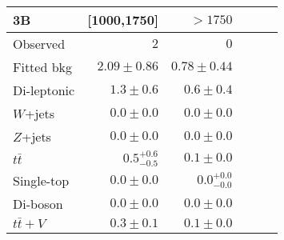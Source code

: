 \begin{tabular*}{\textwidth}{@{\extracolsep{\fill}}lrrrrr}
\toprule
\textbf{3B} & [1000,1750] & $>1750$ \\
\midrule
Observed          & $2$              & $0$                    \\
\midrule
Fitted bkg         & $2.09 \pm 0.86$          & $0.78 \pm 0.44$              \\
\midrule
        Di-leptonic         & $1.3 \pm 0.6$          & $0.6 \pm 0.4$              \\
        $W$+jets         & $0.0 \pm 0.0$          & $0.0 \pm 0.0$              \\
        $Z$+jets         & $0.0 \pm 0.0$          & $0.0 \pm 0.0$              \\
        $t\bar{t}$         & $0.5_{-0.5}^{+0.6}$          & $0.1 \pm 0.0$              \\
        Single-top         & $0.0 \pm 0.0$          & $0.0_{-0.0}^{+0.0}$              \\
        Di-boson         & $0.0 \pm 0.0$          & $0.0 \pm 0.0$              \\
        $t\bar{t}+V$         & $0.3 \pm 0.1$          & $0.1 \pm 0.0$              \\


\bottomrule
\end{tabular*}




